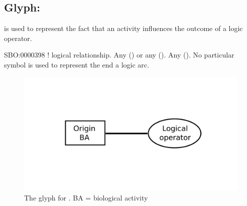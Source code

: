 
\subsection{Glyph:  }\label{sec:af:logicArc}

 is used to represent the fact that an activity influences the outcome of a logic operator.

\begin{glyphDescription}
 \glyphSboTerm SBO:0000398 ! logical relationship.
 \glyphOrigin Any  () or any  ().
 \glyphTarget Any  ().
 \glyphEndPoint No particular symbol is used to represent the end a logic arc.
 \end{glyphDescription}

\begin{figure}[H]
  \centering
  \includegraphics[scale = 0.4]{images/logicArc}
  \caption{The \AF glyph for . BA = biological activity}
  \label{fig:logicArc}
\end{figure}
